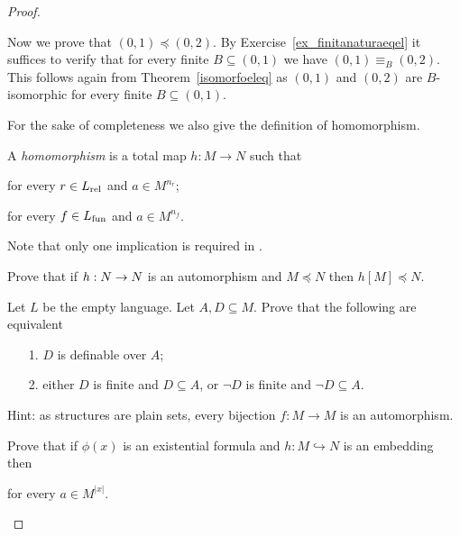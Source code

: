 \begin{proof}
\begin{example}
Now we prove that $(0,1)\preceq (0,2)$.
By Exercise~\ref{ex_finitanaturaeqel} it suffices to verify that for every finite $B\subseteq(0,1)$ we have $(0,1)\equiv_B  (0,2)$.
This follows again from Theorem~\ref{isomorfoeleq} as $(0,1)$ and $(0,2)$ are $B$-isomorphic for every finite $B\subseteq(0,1)$.
\end{example}


For the sake of completeness we also give the definition of homomorphism.

\begin{definition}\label{def_homomorphism}
A \emph{homomorphism} is a total map $h:M\to N$ such that

\qquad for every $r\in L_{\rm rel}$ and $a\in M^{n_r}$;\smallskip\par

\qquad  for every $f\in L_{\rm fun}$ and $a\in M^{n_f}$.

Note that only one implication is required in .
\end{definition}

\begin{exercise}
Prove that if $h:N\rightarrow N$ is an automorphism and $M\preceq N$ then $h[M]\preceq N$.
\end{exercise}

\begin{exercise}
Let $L$ be the empty language.
Let $A,D\subseteq M$.
Prove that the following are equivalent
\begin{itemize}
 \item[1.] $D$ is definable over $A$;
 \item[2.] either $D$ is finite and $D\subseteq A$, or $\neg D$ is finite and $\neg D\subseteq A$.
\end{itemize}
Hint: as structures are plain sets, every bijection $f:M\to M$ is an automorphism.
\end{exercise}

\begin{exercise}\label{dlorlkurb}
Prove that if $\phi(x)$ is an existential formula and $h:M\hookrightarrow N$ is an embedding then

\hfill for every $a\in M^{|x|}$.


\end{exercise}
\end{proof}
